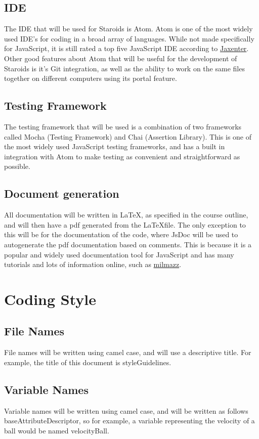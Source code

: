 \documentclass{article}
\begin{document}
\subsection{IDE}
\label{technology:ide}
The IDE that will be used for Staroids is Atom. Atom is one of the most widely used IDE’s for coding in a broad array of languages. While not made specifically for JavaScript, it is still rated a top five JavaScript IDE according to \href{https://jaxenter.com/top-5-javascript-ide-146609.html}{Jaxenter}. Other good features about Atom that will be useful for the development of Staroids is it’s Git integration, as well as the ability to work on the same files together on different computers using its portal feature.
\subsection{Testing Framework}
The testing framework that will be used is a combination of two frameworks called Mocha (Testing Framework) and Chai (Assertion Library). This is one of the most widely used JavaScript testing frameworks, and has a built in integration with Atom to make testing as convenient and straightforward as possible.
\subsection{Document generation}
All documentation will be written in \LaTeX, as specified in the course outline, and will then have a pdf generated from the \LaTeX file. The only exception to this will be for the documentation of the code, where JsDoc will be used to autogenerate the pdf documentation based on comments. This is because it is a popular and widely used documentation tool for JavaScript and has many tutorials and lots of information online, such as \href{https://milmazz.uno/article/2014/08/27/how-to-document-your-javascript-code/}{milmazz}.

\section{Coding Style}
\subsection{File Names}
File names will be written using camel case, and will use a descriptive title. For example, the title of this document is styleGuidelines.
\subsection{Variable Names}
Variable names will be written using camel case, and will be written as follows baseAttributeDescriptor, so for example, a variable representing the velocity of a ball would be named velocityBall.
\end{document}
